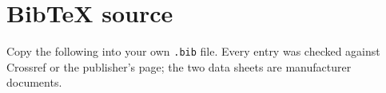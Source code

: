 \documentclass[11pt,a4paper]{article}
\begin{document}



\clearpage
\section*{BibTeX source}
\noindent Copy the following into your own \texttt{.bib} file. Every entry
was checked against Crossref or the publisher's page; the two data sheets are
manufacturer documents.
\scriptsize

\normalsize
\end{document}
